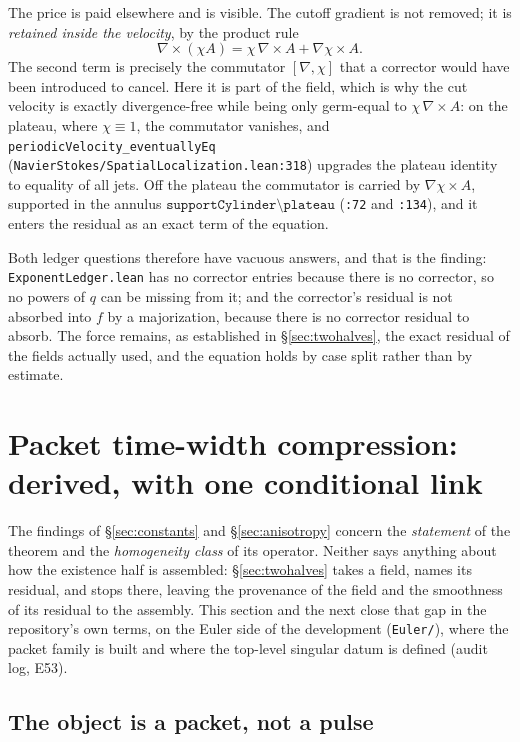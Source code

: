 \documentclass[11pt]{article}
\newcommand{\ct}[1]{\texttt{#1}}
\newcommand{\file}[1]{\texttt{\small #1}}
\theoremstyle{plain}
\theoremstyle{definition}
\theoremstyle{remark}
\begin{document}
The price is paid elsewhere and is visible. The cutoff gradient is not removed;
it is \emph{retained inside the velocity}, by the product rule
\[
  \nabla\times(\chi A)=\chi\,\nabla\times A+\nabla\chi\times A .
\]
The second term is precisely the commutator $[\nabla,\chi]$ that a corrector
would have been introduced to cancel. Here it is part of the field, which is why
the cut velocity is exactly divergence-free while being only germ-equal to
$\chi\,\nabla\times A$: on the plateau, where $\chi\equiv1$, the commutator
vanishes, and \ct{periodicVelocity\_eventuallyEq}
(\file{NavierStokes/SpatialLocalization.lean:318}) upgrades the plateau identity
to equality of all jets. Off the plateau the commutator is carried by
$\nabla\chi\times A$, supported in the annulus
$\ct{supportCylinder}\setminus\ct{plateau}$
(\file{:72} and \file{:134}), and it enters the residual as an exact term of the
equation.

Both ledger questions therefore have vacuous answers, and that is the finding:
\file{ExponentLedger.lean} has no corrector entries because there is no
corrector, so no powers of $q$ can be missing from it; and the corrector's
residual is not absorbed into $f$ by a majorization, because there is no
corrector residual to absorb. The force remains, as established in
\S\ref{sec:twohalves}, the exact residual of the fields actually used, and the
equation holds by case split rather than by estimate.

\section{Packet time-width compression: derived, with one conditional link}
\label{sec:packets}

The findings of \S\ref{sec:constants} and \S\ref{sec:anisotropy} concern the
\emph{statement} of the theorem and the \emph{homogeneity class} of its
operator. Neither says anything about how the existence half is assembled:
\S\ref{sec:twohalves} takes a field, names its residual, and stops there,
leaving the provenance of the field and the smoothness of its residual to
the assembly. This section and the next close that
gap in the repository's own terms, on the Euler side of the development
(\file{Euler/}), where the packet family is built and where the top-level
singular datum is defined (audit log, E53).

\subsection{The object is a packet, not a pulse}
\end{document}
